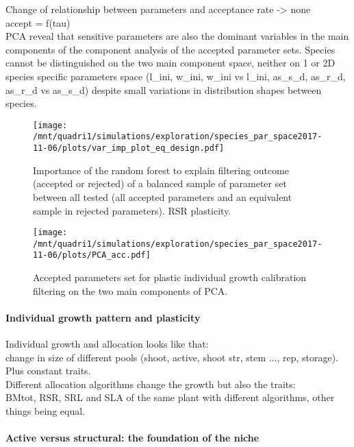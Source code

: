 \documentclass[review]{elsarticle}
\begin{document}
Change of relationship between parameters and acceptance rate -> none\\
accept = f(tau)\\

PCA reveal that sensitive parameters are also the dominant variables in the main components of the component analysis of the accepted parameter sets. Species cannot be distinguished on the two main component space, neither on 1 or 2D species specific parameters space (l\_ini, w\_ini, w\_ini vs l\_ini, as\_s\_d, as\_r\_d, as\_r\_d vs as\_s\_d) despite small variations in distribution shapes between species.\\



\begin{figure}
\texttt{[image: /mnt/quadri1/simulations/exploration/species\_par\_space2017-11-06/plots/var\_imp\_plot\_eq\_design.pdf]}
\caption{Importance of the random forest to explain filtering outcome (accepted or rejected) of a balanced sample of parameter set between all tested (all accepted parameters and an equivalent sample in rejected parameters).  RSR plasticity.}
\end{figure}

\begin{figure}
\texttt{[image: /mnt/quadri1/simulations/exploration/species\_par\_space2017-11-06/plots/PCA\_acc.pdf]}
\caption{Accepted parameters set for plastic individual growth calibration filtering  on the two main components of PCA.}
\end{figure}

\paragraph{Individual growth pattern and plasticity}

Individual growth and allocation looks like that:\\
change in size of different pools (shoot, active, shoot str, stem ..., rep, storage). Plus constant traits.\\

Different allocation algorithms change the growth but also the traits:\\
BMtot, RSR, SRL and SLA of the same plant with different algorithms, other things being equal.

\paragraph{Active versus structural: the foundation of the niche}
\end{document}
